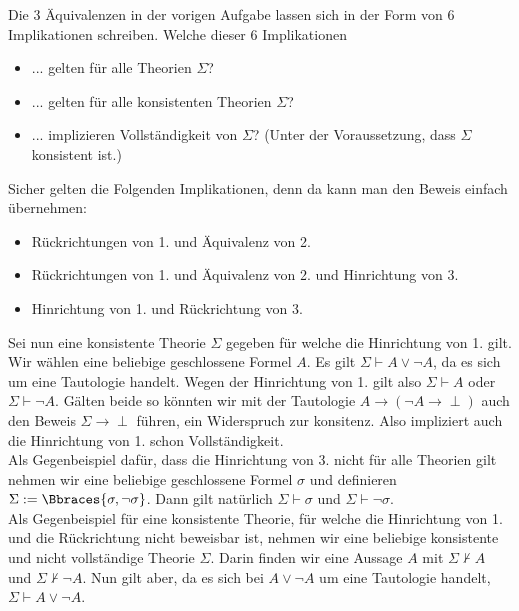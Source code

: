 
\begin{exercise}[114]

Die 3 Äquivalenzen in der vorigen Aufgabe lassen sich in der Form von 6
Implikationen schreiben. Welche dieser 6 Implikationen
\begin{itemize}
  \item ... gelten für alle Theorien $\Sigma$?
  \item ... gelten für alle konsistenten Theorien $\Sigma$?
  \item ... implizieren Vollständigkeit von $\Sigma$? (Unter der Voraussetzung,
  dass $\Sigma$ konsistent ist.)
\end{itemize}
\end{exercise}


\begin{solution}

Sicher gelten die Folgenden Implikationen, denn da kann man den Beweis einfach übernehmen:
\begin{itemize}
  \item Rückrichtungen von 1. und Äquivalenz von 2.
  \item Rückrichtungen von 1. und Äquivalenz von 2. und Hinrichtung von 3.
  \item Hinrichtung von 1. und Rückrichtung von 3.
\end{itemize}
Sei nun eine konsistente Theorie $\Sigma$ gegeben für welche die Hinrichtung von 1. gilt. Wir wählen eine beliebige geschlossene Formel $A$. Es gilt $\Sigma \vdash A \lor \neg A$, da es sich um eine Tautologie handelt. Wegen der Hinrichtung von 1. gilt also $\Sigma \vdash A$ oder $\Sigma \vdash \neg A$. Gälten beide so könnten wir mit der Tautologie $A \rightarrow (\neg A \rightarrow \perp)$ auch den Beweis $\Sigma \rightarrow \perp$ führen, ein Widerspruch zur konsitenz. Also impliziert auch die Hinrichtung von 1. schon Vollständigkeit. \\
Als Gegenbeispiel dafür, dass die Hinrichtung von 3. nicht für alle Theorien gilt nehmen wir eine beliebige geschlossene Formel $\sigma$ und definieren $\Sigma := \Bbraces{\sigma, \neg \sigma}$. Dann gilt natürlich $\Sigma \vdash \sigma$ und $\Sigma \vdash \neg \sigma$. \\
Als Gegenbeispiel für eine konsistente Theorie, für welche die Hinrichtung von 1. und die Rückrichtung nicht beweisbar ist, nehmen wir eine beliebige konsistente und nicht vollständige Theorie $\Sigma$. Darin finden wir eine Aussage $A$ mit $\Sigma \nvdash A$ und $\Sigma \nvdash \neg A$. Nun gilt aber, da es sich bei $A \lor \neg A$ um eine Tautologie handelt, $\Sigma \vdash A \lor \neg A$.

\end{solution}

